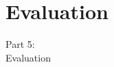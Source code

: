 \section{Evaluation}
\begin{frame}
  \vspace{25mm}
  \begin{center}
    \Huge{Part 5:\\Evaluation}
  \end{center}
\end{frame}
